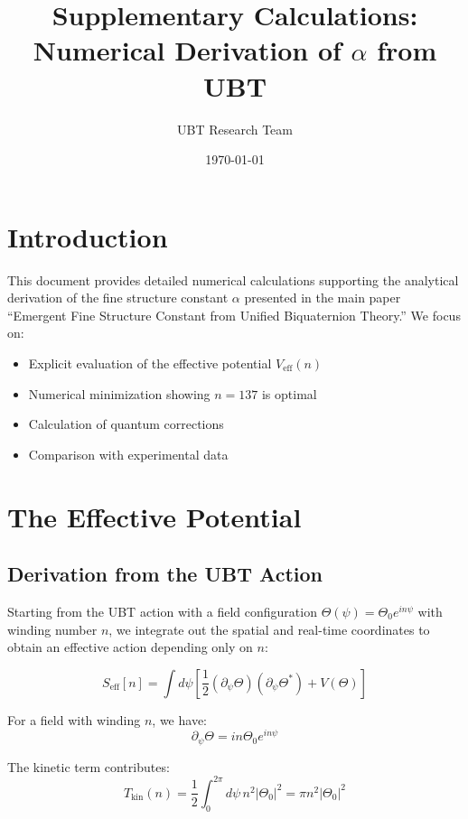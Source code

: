\documentclass[12pt, a4paper]{article}
\title{\textbf{Supplementary Calculations: \\
Numerical Derivation of $\alpha$ from UBT}}
\author{UBT Research Team}
\date{\today}
\begin{document}
\maketitle

\tableofcontents
\newpage

\section{Introduction}

This document provides detailed numerical calculations supporting the analytical derivation of the fine structure constant $\alpha$ presented in the main paper ``Emergent Fine Structure Constant from Unified Biquaternion Theory.'' We focus on:

\begin{itemize}
\item Explicit evaluation of the effective potential $V_{\text{eff}}(n)$
\item Numerical minimization showing $n = 137$ is optimal
\item Calculation of quantum corrections
\item Comparison with experimental data
\end{itemize}

\section{The Effective Potential}

\subsection{Derivation from the UBT Action}

Starting from the UBT action with a field configuration $\Theta(\psi) = \Theta_0 e^{in\psi}$ with winding number $n$, we integrate out the spatial and real-time coordinates to obtain an effective action depending only on $n$:

\begin{equation}
S_{\text{eff}}[n] = \int d\psi \left[ \frac{1}{2}(\partial_\psi \Theta)(\partial_\psi \Theta^*) + V(\Theta) \right]
\end{equation}

For a field with winding $n$, we have:
\begin{equation}
\partial_\psi \Theta = i n \Theta_0 e^{in\psi}
\end{equation}

The kinetic term contributes:
\begin{equation}
T_{\text{kin}}(n) = \frac{1}{2} \int_0^{2\pi} d\psi \, n^2 |\Theta_0|^2 = \pi n^2 |\Theta_0|^2
\end{equation}
\end{document}
